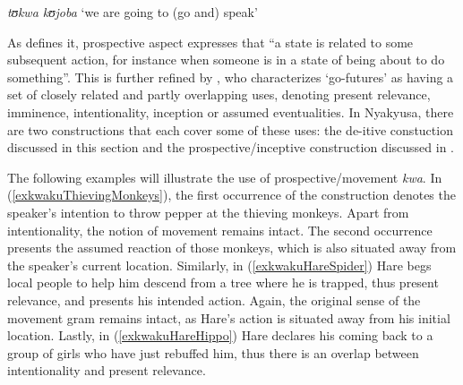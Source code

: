 \begin{exe}
\ex \textit{tʊkwa kʊjoba} \lq we are going to (go and) speak'
\end{exe}

As \citet[76]{ComrieB1976} defines it, prospective aspect expresses that ``a state is related to some subsequent action, for instance when someone is in a state of being about to do something''. This is further refined by \citet[18f]{FleischmanS1982}, who characterizes \lq go-futures' as having a set of closely related and partly overlapping uses, denoting present relevance, imminence, intentionality, inception or assumed eventualities. In Nyakyusa, there are two constructions that each cover some of these uses: the de-itive constuction discussed in this section and the prospective/inceptive construction discussed in .

The following examples will illustrate the use of prospective/movement \textit{kwa}. In (\ref{exkwakuThievingMonkeys}), the first occurrence of the construction denotes the speaker's intention to throw pepper at the thieving monkeys. Apart from intentionality, the notion of movement remains intact. The second occurrence presents the assumed reaction of those monkeys, which is also situated away from the speaker's current location. Similarly, in (\ref{exkwakuHareSpider}) Hare begs local people to help him descend from a tree where he is trapped, thus present relevance, and presents his intended action. Again, the original sense of the movement gram remains intact, as Hare's action is situated away from his initial location. Lastly, in (\ref{exkwakuHareHippo}) Hare declares his coming back to a group of girls who have just rebuffed him, thus there is an overlap between intentionality and present relevance.
 
